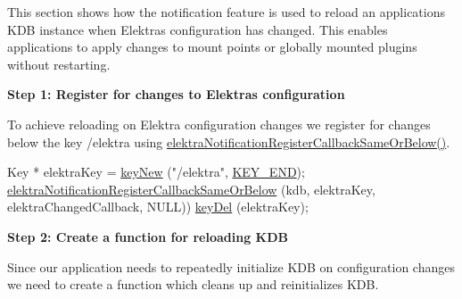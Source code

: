 This section shows how the notification feature is used to reload an application\textquotesingle{}s K\+DB instance when Elektra\textquotesingle{}s configuration has changed. This enables applications to apply changes to mount points or globally mounted plugins without restarting.

{\bfseries Step 1\+: Register for changes to Elektra\textquotesingle{}s configuration}

To achieve reloading on Elektra configuration changes we register for changes below the key {\ttfamily /elektra} using {\ttfamily \hyperlink{group__kdbnotification_ga374edd4f4fff527d6511ce4d0df62681}{elektra\+Notification\+Register\+Callback\+Same\+Or\+Below()}}.


\begin{DoxyCode}
Key * elektraKey = \hyperlink{group__key_gad23c65b44bf48d773759e1f9a4d43b89}{keyNew} (\textcolor{stringliteral}{"/elektra"}, \hyperlink{group__key_gga91fb3178848bd682000958089abbaf40aa8adb6fcb92dec58fb19410eacfdd403}{KEY\_END});
\hyperlink{group__kdbnotification_ga374edd4f4fff527d6511ce4d0df62681}{elektraNotificationRegisterCallbackSameOrBelow} (kdb, 
      elektraKey, elektraChangedCallback, NULL))
\hyperlink{group__key_ga3df95bbc2494e3e6703ece5639be5bb1}{keyDel} (elektraKey);
\end{DoxyCode}


{\bfseries Step 2\+: Create a function for reloading K\+DB}

Since our application needs to repeatedly initialize K\+DB on configuration changes we need to create a function which cleans up and reinitializes K\+DB.


